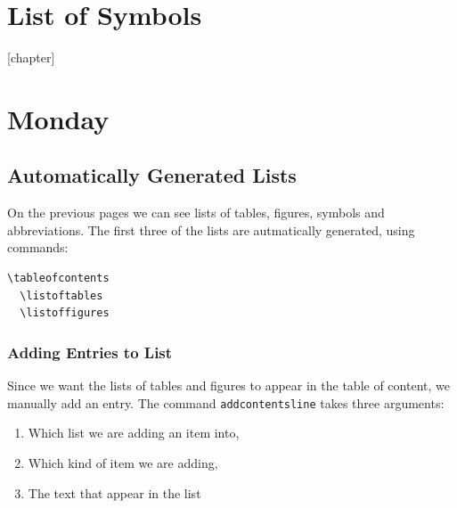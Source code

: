 \documentclass[a4paper,10pt]{report} %
\begin{document}
%  


\maketitle
{}
   \tableofcontents
    \label{contents}
   \let\clearpage\relax
    \listoftables  
  \let\clearpage\relax
   \listoffigures\label{lof}  
    \chapter*{List of Symbols}
       

\setcounter{chapter}{1}
\setcounter{figure}{1} 

\newpage

\setcounter{chapter}{2}
[chapter]
\chapter{Monday} 

\section{Automatically Generated Lists}\label{sec:automatic}
On the previous pages we can see lists of tables, figures, symbols and abbreviations. The first three of the lists are autmatically generated, using commands:

\begin{lstlisting}[language={[latex]tex}, frame=single,basicstyle=\footnotesize]
  \tableofcontents
  \listoftables
  \listoffigures
\end{lstlisting}

\subsection{Adding Entries to List}
 Since we want the lists of tables and figures to appear in the table of content, we manually add an entry. The command \texttt{addcontentsline} takes three arguments:
 \begin{enumerate}[label=\arabic*)]
  \item Which list we are adding an item into,
  \item Which kind of item we are adding,
  \item The text that appear in the list
 \end{enumerate}
\end{document}
